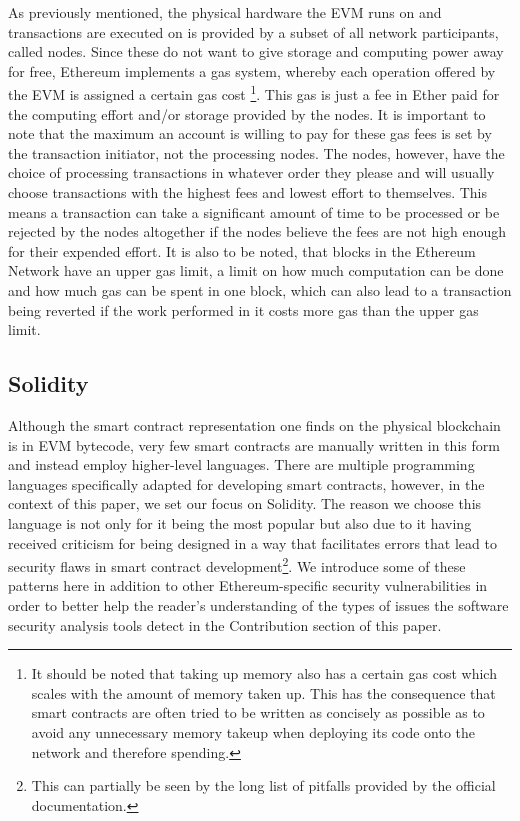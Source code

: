 \documentclass[letterpaper,twocolumn,10pt]{article}
\begin{document}
As previously mentioned, the physical hardware the EVM runs on and transactions are executed on is provided by a subset of all network participants, called nodes. Since these do not want to give storage and computing power away for free, Ethereum implements a gas system, whereby each operation offered by the EVM is assigned a certain gas cost \footnote{It should be noted that taking up memory also has a certain gas cost which scales with the amount of memory taken up. This has the consequence that smart contracts are often tried to be written as concisely as possible as to avoid any unnecessary memory takeup when deploying its code onto the network and therefore spending.}. This gas is just a fee in Ether paid for the computing effort and/or storage provided by the nodes. It is important to note that the maximum an account is willing to pay for these gas fees is set by the transaction initiator, not the processing nodes. The nodes, however, have the choice of processing transactions in whatever order they please and will usually choose transactions with the highest fees and lowest effort to themselves. This means a transaction can take a significant amount of time to be processed or be rejected by the nodes altogether if the nodes believe the fees are not high enough for their expended effort. It is also to be noted, that blocks in the Ethereum Network have an upper gas limit, a limit on how much computation can be done and how much gas can be spent in one block, which can also lead to a transaction being reverted if the work performed in it costs more gas than the upper gas limit.

\subsection{Solidity}
\label{subsection:sol}
Although the smart contract representation one finds on the physical blockchain is in EVM bytecode, very few smart contracts are manually written in this form and instead employ higher-level languages. There are multiple programming languages specifically adapted for developing smart contracts, however, in the context of this paper, we set our focus on Solidity. The reason we choose this language is not only for it being the most popular \cite{gebele_2020} but also due to it having received criticism for being designed in a way that facilitates errors that lead to security flaws in smart contract development\footnote{This can partially be seen by the long list of pitfalls provided by the official documentation\cite{ethereumrevision0bbfe453}.}. We introduce some of these patterns here in addition to other Ethereum-specific security vulnerabilities in order to better help the reader's understanding of the types of issues the software security analysis tools detect in the Contribution section of this paper.
\end{document}
